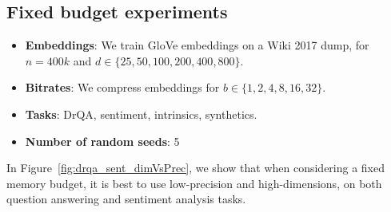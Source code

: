 \subsection{Fixed budget experiments}
\begin{itemize}
	\item \textbf{Embeddings}: We train GloVe embeddings on a Wiki 2017 dump, for $n=400k$ and $d \in \{25,50,100,200,400,800\}$.
	\item \textbf{Bitrates}: We compress embeddings for $b \in \{1,2,4,8,16,32\}$.
	\item \textbf{Tasks}: DrQA, sentiment, intrinsics, synthetics.
	\item \textbf{Number of random seeds}: 5
\end{itemize}

In Figure~\ref{fig:drqa_sent_dimVsPrec}, we show that when considering a fixed memory budget, it is best to use low-precision and high-dimensions, on both question answering and sentiment analysis tasks.

